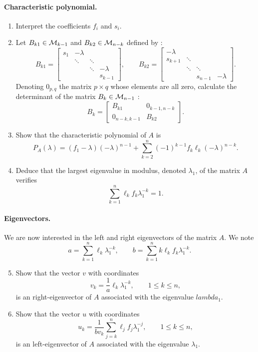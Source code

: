 \paragraph{Characteristic polynomial.}
\begin{enumerate}
  \item Interpret the coefficients $f_i$ and $s_i$.
  \item Let $B_{k1} \in \mathcal{M}_{k-1}$ and $B_{k2} \in \mathcal{M}_{n-k}$ defined by :
  $$
  B_{k1} = \left[\begin{array}{cccc}
            s_1 & -\lambda & &  \\
            & \ddots & \ddots & \\
            & & \ddots & -\lambda \\
            & & & s_{k-1}
          \end{array}\right], \qquad
  B_{k2} = \left[\begin{array}{cccc}
            -\lambda & & & \\
            s_{k+1} & \ddots & & \\
            & \ddots & \ddots & \\
            & & s_{n-1} & -\lambda
          \end{array}\right].
  $$
  Denoting $0_{p,q}$ the matrix $p \times q$ whose elements are all zero, calculate the determinant of the matrix $B_k \in \mathcal{M}_{n-1}$ :
  $$
  B_k = \left[\begin{array}{cc}
            B_{k1} & 0_{k-1, n-k} \\
            0_{n-k, k-1} & B_{k2}
          \end{array}\right].
  $$
  \item Show that the characteristic polynomial of $A$ is
  $$
  P_A(\lambda) = (f_1 - \lambda) (-\lambda)^{n-1} + \sum_{k=2}^{n} (-1)^{k-1} f_k \ell_k (-\lambda)^{n-k}.
  $$
  \item Deduce that the largest eigenvalue in modulus, denoted $\lambda_1$, of the matrix $A$ verifies
  $$
  \sum_{k=1}^n \ell_k f_k \lambda_1^{-k} = 1.
  $$
\end{enumerate}

\paragraph{Eigenvectors.}
We are now interested in the left and right eigenvectors of the matrix $A$. We note $$
a = \sum_{k=1}^n \ell_k \lambda_1^{-k}, \qquad
b = \sum_{k=1}^n k \ell_k f_k \lambda_1^{-k}.
$$
\begin{enumerate}
  \setcounter{enumi}{4}
  \item Show that the vector $v$ with coordinates
  $$
  v_k = \frac1a \ell_k \lambda_1^{-k}, \qquad 1 \leq k \leq n,
  $$
  is an right-eigenvector of $A$ associated with the eigenvalue $lambda_1$.
  \item Show that the vector $u$ with coordinates
  $$
  u_k = \frac1{b v_k} \sum_{j=k}^n \ell_j f_j \lambda_1^{-j}, \qquad 1 \leq k \leq n,
  $$
  is an left-eigenvector of $A$ associated with the eigenvalue $\lambda_1$.
\end{enumerate}


